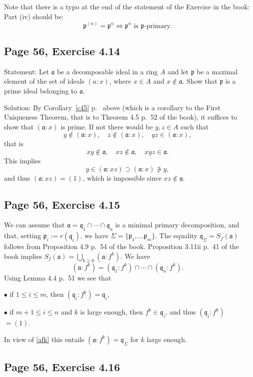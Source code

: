 \documentclass[parskip=half,fontsize=12pt]{scrartcl}%
\newcommand{\mf}{\mathfrak}
\newcommand{\aaa}{\mf a}
\newcommand{\ppp}{\mf p}
\newcommand{\qqq}{\mf q}
\newcommand{\bu}{\bullet}
\begin{document}
Note that there is a typo at the end of the statement of the Exercise in the book: Part (iv) should be: 
$$
\ppp^{(n)}=\ppp^n\iff\ppp^n\text{ is }\ppp\text{-primary.}
$$ 

\subsection{Page 56, Exercise 4.14}%

Statement: Let $\aaa$ be a decomposable ideal in a ring $A$ and let $\ppp$ be a maximal element of the set of ideals $(a:x)$, where $x\in A$ and $x\notin\aaa$. Show that $\ppp$ is a prime ideal belonging to $\aaa$.

Solution: By Corollary~\ref{c45} p.~\pageref{c45} above (which is a corollary to the First Uniqueness Theorem, that is to Theorem 4.5 p.~52 of the book), it suffices to show that $(\aaa:x)$ is prime. If not there would be $y,z\in A$ such that 
$$
y\notin(\aaa:x),\quad z\notin(\aaa:x),\quad yz\in(\aaa:x),
$$ 
that is 
$$
xy\notin\aaa,\quad xz\notin\aaa,\quad xyz\in\aaa.
$$ 
This implies 
$$
y\in(\aaa:xz)\supset(\aaa:x)\not\ni y,
$$ 
and thus $(\aaa:xz)=(1)$, which is impossible since $xz\notin\aaa$.

\subsection{Page 56, Exercise 4.15}%

We can assume that $\aaa=\qqq_1\cap\cdots\cap\qqq_n$ is a minimal primary decomposition, and that, setting $\ppp_i:=r(\qqq_i)$, we have $\Sigma=\{\ppp_1,\dots\ppp_m\}$. The equality $\qqq_\Sigma=S_f(\aaa)$ follows from Proposition 4.9 p.~54 of the book. Proposition 3.11ii p.~41 of the book implies $S_f(\aaa)=\bigcup_{k\ge0}(\aaa:f^k)$. We have 
\begin{equation}\label{afk}
(\aaa:f^k)=(\qqq_1:f^k)\cap\cdots\cap(\qqq_n:f^k).
\end{equation} 
Using Lemma 4.4 p.~51 we see that  

$\bu$ if $1\le i\le m$, then $(\qqq_i:f^k)=\qqq_i$,  

$\bu$ if $m+1\le i\le n$ and $k$ is large enough, then $f^k\in\qqq_i$, and thus $(\qqq_i:f^k)$ $=(1)$.

In view of \eqref{afk} this entails $(\aaa:f^k)=\qqq_\Sigma$ for $k$ large enough.

\subsection{Page 56, Exercise 4.16}%
\end{document}
